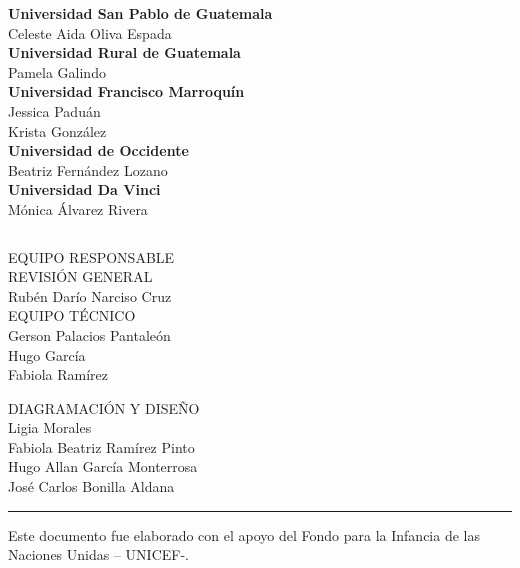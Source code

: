 \begin{multicols}{2}
\begin{center}
	\textbf{Universidad San Pablo de Guatemala}\\
	Celeste Aida Oliva Espada\\ [0.4cm]
	
	\textbf{Universidad Rural de Guatemala}\\
	Pamela Galindo\\ [0.4cm]
	
	\textbf{Universidad Francisco Marroquín}\\
	Jessica Paduán\\
	Krista González\\ [0.4cm]
	
	\textbf{Universidad de Occidente}\\
	Beatriz Fernández Lozano\\ [0.4cm]
	
	\textbf{Universidad Da Vinci}\\
	Mónica Álvarez Rivera\\[0.8cm]
	
	
\end{center}

\end{multicols}
\setcounter{page}{0}\cleardoublepage
\clearpage

$\ $
\vspace{1cm}

\begin{center}
	{\Bold \LARGE EQUIPO RESPONSABLE}\\[2cm]
	
	{\Bold \large \color{color1!89!black} REVISIÓN GENERAL}\\[0.2cm]
	Rubén Darío Narciso Cruz\\[0.8cm]
	
	
	{\Bold \large \color{color1!89!black} EQUIPO TÉCNICO}\\[0.2cm]
	Gerson Palacios Pantaleón\\
	Hugo García\\
	Fabiola Ramírez
	
{\Bold \large \color{color1!89!black} DIAGRAMACIÓN Y DISEÑO}\\[0.2cm]
Ligia Morales\\
Fabiola Beatriz Ramírez Pinto\\
Hugo Allan García Monterrosa\\
José Carlos Bonilla Aldana\\[8cm]

\hrule
	Este documento fue elaborado con el apoyo del Fondo para la Infancia de las Naciones Unidas – UNICEF-.\\[0.8cm]


\end{center}\setcounter{page}{0}\cleardoublepage


